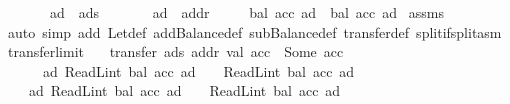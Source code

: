 \begin{isabellebody}
\ \ \ \ \ \ \ {\isachardoublequoteopen}ad\ {\isasymnoteq}\ ads{\isachardoublequoteclose}\isanewline
\ \ \ \ \ \ \ {\isachardoublequoteopen}ad\ {\isasymnoteq}\ addr{\isachardoublequoteclose}\isanewline
\ \ \ \ \ {\isachardoublequoteopen}bal\ {\isacharparenleft}{\kern0pt}acc{\isacharprime}{\kern0pt}\ ad{\isacharparenright}{\kern0pt}\ {\isacharequal}{\kern0pt}\ bal\ {\isacharparenleft}{\kern0pt}acc\ ad{\isacharparenright}{\kern0pt}{\isachardoublequoteclose}\isanewline
%
\isadelimproof
%
\endisadelimproof
%
\isatagproof
{}\isamarkupfalse%
\ assms\ \isamarkupfalse%
\ {\isacharparenleft}{\kern0pt}auto\ simp\ add{\isacharcolon}{\kern0pt}\ Let{\isacharunderscore}{\kern0pt}def\ addBalance{\isacharunderscore}{\kern0pt}def\ subBalance{\isacharunderscore}{\kern0pt}def\ transfer{\isacharunderscore}{\kern0pt}def\ split{\isacharcolon}{\kern0pt}if{\isacharunderscore}{\kern0pt}split{\isacharunderscore}{\kern0pt}asm{\isacharparenright}{\kern0pt}%
\endisatagproof
{\isafoldproof}%
%
\isadelimproof
\isanewline
%
\endisadelimproof
\isanewline
{}\isamarkupfalse%
\ transfer{\isacharunderscore}{\kern0pt}limit{\isacharcolon}{\kern0pt}\isanewline
\ \ \ {\isachardoublequoteopen}transfer\ ads\ addr\ val\ acc\ {\isacharequal}{\kern0pt}\ Some\ acc{\isacharprime}{\kern0pt}{\isachardoublequoteclose}\isanewline
\ \ \ \ \ \ {\isachardoublequoteopen}{\isasymforall}ad{\isachardot}{\kern0pt}\ ReadL\isactrlsub i\isactrlsub n\isactrlsub t\ {\isacharparenleft}{\kern0pt}bal\ {\isacharparenleft}{\kern0pt}acc\ ad{\isacharparenright}{\kern0pt}{\isacharparenright}{\kern0pt}\ {\isasymge}\ {}\ {\isasymand}\ ReadL\isactrlsub i\isactrlsub n\isactrlsub t\ {\isacharparenleft}{\kern0pt}bal\ {\isacharparenleft}{\kern0pt}acc\ ad{\isacharparenright}{\kern0pt}{\isacharparenright}{\kern0pt}\ {\isacharless}{\kern0pt}\ {}\ {\isacharcircum}{\kern0pt}\ {}{}{}{\isachardoublequoteclose}\isanewline
\ \ \ \ {\isachardoublequoteopen}{\isasymforall}ad{\isachardot}{\kern0pt}\ ReadL\isactrlsub i\isactrlsub n\isactrlsub t\ {\isacharparenleft}{\kern0pt}bal\ {\isacharparenleft}{\kern0pt}acc{\isacharprime}{\kern0pt}\ ad{\isacharparenright}{\kern0pt}{\isacharparenright}{\kern0pt}\ {\isasymge}\ {}\ {\isasymand}\ ReadL\isactrlsub i\isactrlsub n\isactrlsub t\ {\isacharparenleft}{\kern0pt}bal\ {\isacharparenleft}{\kern0pt}acc{\isacharprime}{\kern0pt}\ ad{\isacharparenright}{\kern0pt}{\isacharparenright}{\kern0pt}\ {\isacharless}{\kern0pt}\ {}\ {\isacharcircum}{\kern0pt}\ {}{}{}{\isachardoublequoteclose}\isanewline

\end{isabellebody}
